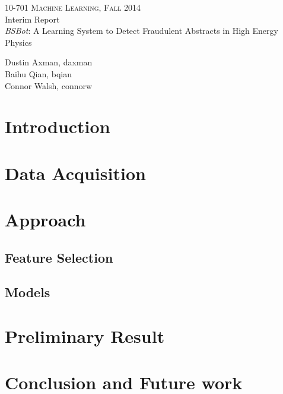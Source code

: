 \documentclass[11pt]{article}
\begin{document}
\clearpage
\thispagestyle{empty}
\vspace*{0px}
\begin{center}
	\textsc{10-701 Machine Learning, Fall 2014}\\
	\large{Interim Report}\\
	\vspace{10px}
	\large{\emph{BSBot}: A Learning System to Detect Fraudulent Abstracts in High Energy Physics} \\
	\vspace{10px}
	\normalsize{ 
		
		Dustin Axman, daxman\\
		Baihu Qian, bqian\\
		Connor Walsh, connorw\\
	 }

\end{center}

\section{Introduction}


%

\section{Data Acquisition}


\section{Approach}
\subsection{Feature Selection}


\subsection{Models}



\section{Preliminary Result}


\section{Conclusion and Future work}




\end{document}
